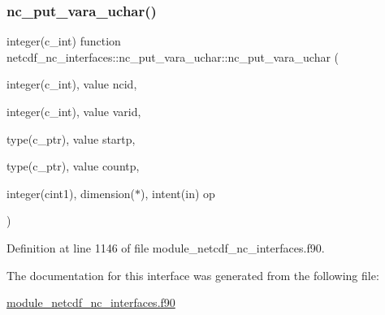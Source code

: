 \subsubsection{\texorpdfstring{nc\+\_\+put\+\_\+vara\+\_\+uchar()}{nc\_put\_vara\_uchar()}}
{\footnotesize\ttfamily integer(c\+\_\+int) function netcdf\+\_\+nc\+\_\+interfaces\+::nc\+\_\+put\+\_\+vara\+\_\+uchar\+::nc\+\_\+put\+\_\+vara\+\_\+uchar (\begin{DoxyParamCaption}\item[{integer(c\+\_\+int), value}]{ncid,  }\item[{integer(c\+\_\+int), value}]{varid,  }\item[{type(c\+\_\+ptr), value}]{startp,  }\item[{type(c\+\_\+ptr), value}]{countp,  }\item[{integer(cint1), dimension($\ast$), intent(in)}]{op }\end{DoxyParamCaption})}



Definition at line 1146 of file module\+\_\+netcdf\+\_\+nc\+\_\+interfaces.\+f90.



The documentation for this interface was generated from the following file\+:\begin{DoxyCompactItemize}
\item 
\hyperlink{module__netcdf__nc__interfaces_8f90}{module\+\_\+netcdf\+\_\+nc\+\_\+interfaces.\+f90}\end{DoxyCompactItemize}

